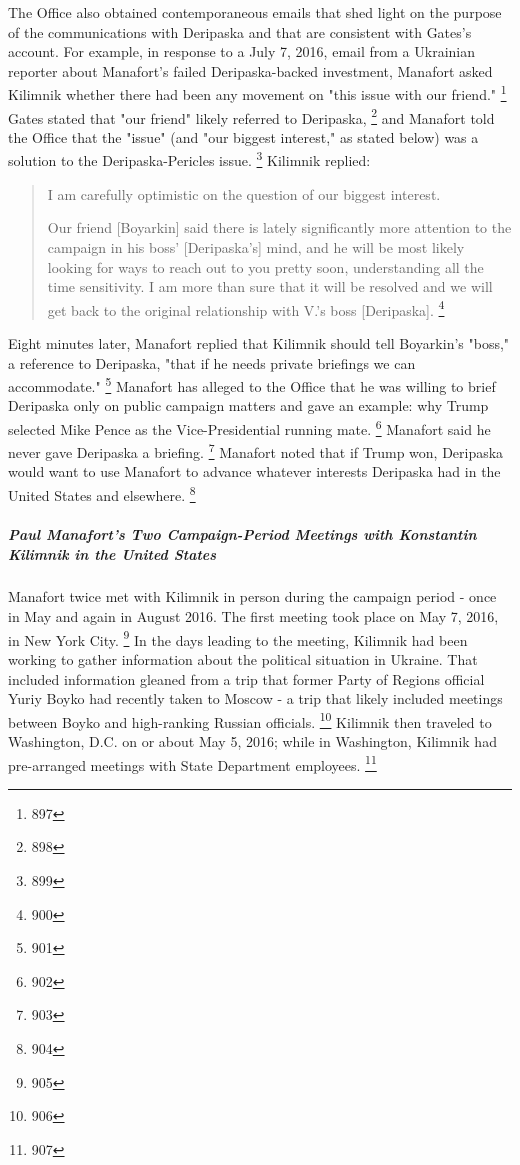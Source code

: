 The Office also obtained contemporaneous emails that shed light on the purpose of the communications with Deripaska and that are consistent with Gates's account.
For example, in response to a July 7, 2016, email from a Ukrainian reporter about Manafort's failed Deripaska-backed investment, Manafort asked Kilimnik whether there had been any movement on "this issue with our friend."%
\footnote{897}
Gates stated that "our friend" likely referred to Deripaska,%
\footnote{898}
and Manafort told the Office that the "issue" (and "our biggest interest," as stated below) was a solution to the Deripaska-Pericles issue.%
\footnote{899}
Kilimnik replied:

\begin{quote}
I am carefully optimistic on the question of our biggest interest.

Our friend [Boyarkin] said there is lately significantly more attention to the campaign in his boss' [Deripaska's] mind, and he will be most likely looking for ways to reach out to you pretty soon, understanding all the time sensitivity.
I am more than sure that it will be resolved and we will get back to the original relationship with V.'s boss [Deripaska].%
\footnote{900}
\end{quote}

Eight minutes later, Manafort replied that Kilimnik should tell Boyarkin's "boss," a reference to Deripaska, "that if he needs private briefings we can accommodate."%
\footnote{901}
Manafort has alleged to the Office that he was willing to brief Deripaska only on public campaign matters and gave an example: why Trump selected Mike Pence as the Vice-Presidential running mate.%
\footnote{902}
Manafort said he never gave Deripaska a briefing.%
\footnote{903}
Manafort noted that if Trump won, Deripaska would want to use Manafort to advance whatever interests Deripaska had in the United States and elsewhere.%
\footnote{904}

\subparagraph{Paul Manafort's Two Campaign-Period Meetings with Konstantin Kilimnik in the United States}

Manafort twice met with Kilimnik in person during the campaign period - once in May and again in August 2016.
The first meeting took place on May 7, 2016, in New York City.%
\footnote{905}
In the days leading to the meeting, Kilimnik had been working to gather information about the political situation in Ukraine.
That included information gleaned from a trip that former Party of Regions official Yuriy Boyko had recently taken to Moscow - a trip that likely included meetings between Boyko and high-ranking Russian officials.%
\footnote{906}
Kilimnik then traveled to Washington, D.C. on or about May 5, 2016; while in Washington, Kilimnik had pre-arranged meetings with State Department employees.%
\footnote{907}

